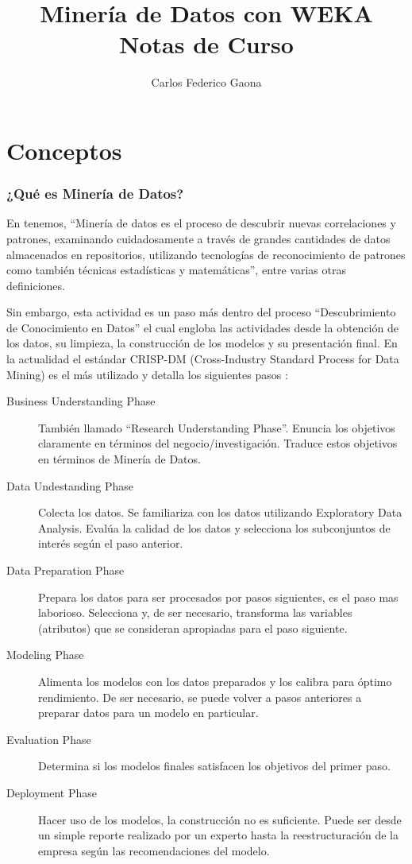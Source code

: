 \documentclass[10pt,a4paper]{article}
\author{Carlos Federico Gaona}
\title{Minería de Datos con WEKA \\ Notas de Curso}
\date{}
\begin{document}
\maketitle
\part{Conceptos}
\section{¿Qué es Minería de Datos?}
En \cite{larose2014discovering} tenemos, ``Minería de datos es el proceso de descubrir nuevas correlaciones y patrones, examinando cuidadosamente a través de grandes cantidades de datos almacenados en repositorios, utilizando tecnologías de reconocimiento de patrones como también técnicas estadísticas y matemáticas'', entre varias otras definiciones.

Sin embargo, esta actividad es un paso más dentro del proceso ``Descubrimiento de Conocimiento en Datos'' el cual engloba las actividades desde la obtención de los datos, su limpieza, la construcción de los modelos y su presentación final. En la actualidad el estándar CRISP-DM (Cross-Industry Standard Process for Data Mining) es el más utilizado \cite{oct2014poll} y detalla los siguientes pasos \cite{larose2014discovering}:
\begin{description}
\item[Business Understanding Phase] También llamado ``Research Understanding Phase''. Enuncia los objetivos claramente en términos del negocio/investigación. Traduce estos objetivos en términos de Minería de Datos.
\item[Data Undestanding Phase] Colecta los datos. Se familiariza con los datos utilizando Exploratory Data Analysis. Evalúa la calidad de los datos y selecciona los subconjuntos de interés según el paso anterior.
\item[Data Preparation Phase] Prepara los datos para ser procesados por pasos siguientes, es el paso mas laborioso. Selecciona y, de ser necesario, transforma las variables (atributos) que se consideran apropiadas para el paso siguiente.
\item[Modeling Phase] Alimenta los modelos con los datos preparados y los calibra para óptimo rendimiento. De ser necesario, se puede volver a pasos anteriores a preparar datos para un modelo en particular.
\item[Evaluation Phase] Determina si los modelos finales satisfacen los objetivos del primer paso.
\item[Deployment Phase] Hacer uso de los modelos, la construcción no es suficiente. Puede ser desde un simple reporte realizado por un experto hasta la reestructuración de la empresa según las recomendaciones del modelo.
\end{description}
\end{document}
